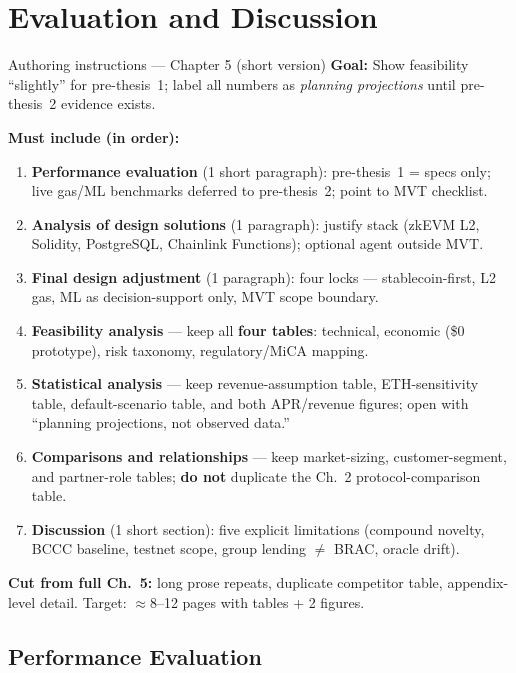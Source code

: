 \documentclass[12pt, a4paper]{report}
\begin{document}
\chapter{Evaluation and Discussion}
\label{ch:evaluation-compressed}

\begin{chapterinstruction}{Authoring instructions --- Chapter 5 (short version)}
\textbf{Goal:} Show feasibility ``slightly'' for pre-thesis~1; label all numbers as \textit{planning projections} until pre-thesis~2 evidence exists.

\textbf{Must include (in order):}
\begin{enumerate}[noitemsep]
\item \textbf{Performance evaluation} (1 short paragraph): pre-thesis~1 = specs only; live gas/ML benchmarks deferred to pre-thesis~2; point to MVT checklist.
\item \textbf{Analysis of design solutions} (1 paragraph): justify stack (zkEVM L2, Solidity, PostgreSQL, Chainlink Functions); optional agent outside MVT.
\item \textbf{Final design adjustment} (1 paragraph): four locks --- stablecoin-first, L2 gas, ML as decision-support only, MVT scope boundary.
\item \textbf{Feasibility analysis} --- keep all \textbf{four tables}: technical, economic (\$0 prototype), risk taxonomy, regulatory/MiCA mapping.
\item \textbf{Statistical analysis} --- keep revenue-assumption table, ETH-sensitivity table, default-scenario table, and both APR/revenue figures; open with ``planning projections, not observed data.''
\item \textbf{Comparisons and relationships} --- keep market-sizing, customer-segment, and partner-role tables; \textbf{do not} duplicate the Ch.~2 protocol-comparison table.
\item \textbf{Discussion} (1 short section): five explicit limitations (compound novelty, BCCC baseline, testnet scope, group lending $\neq$ BRAC, oracle drift).
\end{enumerate}

\textbf{Cut from full Ch.~5:} long prose repeats, duplicate competitor table, appendix-level detail. Target: $\approx$8--12 pages with tables + 2 figures.
\end{chapterinstruction}

\section{Performance Evaluation}
\label{sec:performance-eval}
\label{sec:cost-model}
\label{sec:gas-cost}
\label{sec:eval-method}
\end{document}
